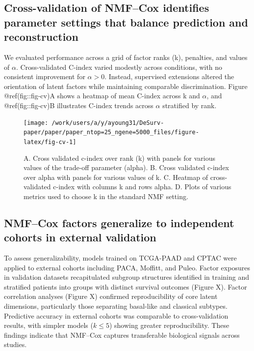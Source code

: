 \documentclass[9pt,twocolumn,twoside,]{pnas-new}
\begin{document}
\subsection{Cross-validation of NMF--Cox identifies parameter settings
that balance prediction and
reconstruction}\label{cross-validation-of-nmfcox-identifies-parameter-settings-that-balance-prediction-and-reconstruction}

We evaluated performance across a grid of factor ranks (k), penalties,
and values of \(\alpha\). Cross-validated C-index varied modestly across
conditions, with no consistent improvement for \(\alpha>0\). Instead,
supervised extensions altered the orientation of latent factors while
maintaining comparable discrimination. Figure @ref(fig::fig-cv)A shows a
heatmap of mean C-index across k and \(\alpha\), and @ref(fig::fig-cv)B
illustrates C-index trends across \(\alpha\) stratified by rank.

\begin{figure}[t]

{\centering \texttt{[image: /work/users/a/y/ayoung31/DeSurv-paper/paper/paper\_ntop=25\_ngene=5000\_files/figure-latex/fig-cv-1]} 

}

\caption{A. Cross validated c-index over rank (k) with panels for various values of the trade-off parameter (alpha). B. Cross validated c-index over alpha with panels for various values of k. C. Heatmap of cross-validated c-index with columns k and rows alpha. D. Plots of various metrics used to choose k in the standard NMF setting.}\label{fig:fig-cv}
\end{figure}

\subsection{NMF--Cox factors generalize to independent cohorts in
external
validation}\label{nmfcox-factors-generalize-to-independent-cohorts-in-external-validation}

To assess generalizability, models trained on TCGA-PAAD and CPTAC were
applied to external cohorts including PACA, Moffitt, and Puleo. Factor
exposures in validation datasets recapitulated subgroup structures
identified in training and stratified patients into groups with distinct
survival outcomes (Figure X). Factor correlation analyses (Figure X)
confirmed reproducibility of core latent dimensions, particularly those
separating basal-like and classical subtypes. Predictive accuracy in
external cohorts was comparable to cross-validation results, with
simpler models (\(k\leq 5\)) showing greater reproducibility. These
findings indicate that NMF--Cox captures transferable biological signals
across studies.
\end{document}
